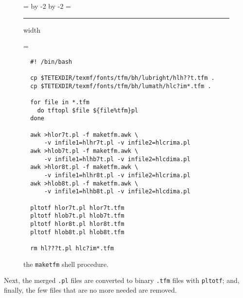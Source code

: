 \documentclass[a4paper]{article}
\newenvironment{bigbox}
{\begingroup\boxfigwidth=\hsize%
  \advance\boxfigwidth by -2\fboxrule%
  \advance\boxfigwidth by -2\fboxsep%
  \setbox4=\vbox\bgroup\hsize\boxfigwidth%
  \hrule height0pt width\boxfigwidth\par\bigskip%
  \linewidth=\boxfigwidth%
}{\smallskip\egroup\fbox{\box4}\endgroup}
\begin{document}
\begin{figure}[htbp]
  \begin{bigbox}
\begin{verbatim}
  #! /bin/bash

  cp $TETEXDIR/texmf/fonts/tfm/bh/lubright/hlh??t.tfm .
  cp $TETEXDIR/texmf/fonts/tfm/bh/lumath/hlc?im*.tfm .

  for file in *.tfm
    do tftopl $file ${file%tfm}pl
  done

  awk >hlor7t.pl -f maketfm.awk \
      -v infile1=hlhr7t.pl -v infile2=hlcrima.pl
  awk >hlob7t.pl -f maketfm.awk \
      -v infile1=hlhb7t.pl -v infile2=hlcdima.pl
  awk >hlor8t.pl -f maketfm.awk \
      -v infile1=hlhr8t.pl -v infile2=hlcrima.pl
  awk >hlob8t.pl -f maketfm.awk \
      -v infile1=hlhb8t.pl -v infile2=hlcdima.pl

  pltotf hlor7t.pl hlor7t.tfm
  pltotf hlob7t.pl hlob7t.tfm
  pltotf hlor8t.pl hlor8t.tfm
  pltotf hlob8t.pl hlob8t.tfm

  rm hl???t.pl hlc?im*.tfm
\end{verbatim}
  \end{bigbox}
  \caption{the \texttt{maketfm} shell procedure.}
  \label{fig:tfm}
\end{figure}

Next, the merged \verb|.pl| files are converted to binary
\verb|.tfm| files with \verb|pltotf|; and, finally, the few
files that are no more needed are removed.
\end{document}
